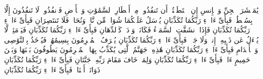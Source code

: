 یَٰمَعۡشَرَ ٱلۡجِنِّ وَٱلۡإِنسِ إِنِ ٱسۡتَطَعۡتُمۡ أَن تَنفُذُوا۟ مِنۡ أَقۡطَارِ ٱلسَّمَٰوَٰتِ وَٱلۡأَرۡضِ فَٱنفُذُوا۟ۚ لَا تَنفُذُونَ إِلَّا بِسُلۡطَٰنࣲ%
\stopbuffer%
\startbuffer[\q:55:34]
فَبِأَیِّ ءَالَاۤءِ رَبِّكُمَا تُكَذِّبَانِ%
\stopbuffer%
\startbuffer[\q:55:35]
یُرۡسَلُ عَلَیۡكُمَا شُوَاظࣱ مِّن نَّارࣲ وَنُحَاسࣱ فَلَا تَنتَصِرَانِ%
\stopbuffer%
\startbuffer[\q:55:36]
فَبِأَیِّ ءَالَاۤءِ رَبِّكُمَا تُكَذِّبَانِ%
\stopbuffer%
\startbuffer[\q:55:37]
فَإِذَا ٱنشَقَّتِ ٱلسَّمَاۤءُ فَكَانَتۡ وَرۡدَةࣰ كَٱلدِّهَانِ%
\stopbuffer%
\startbuffer[\q:55:38]
فَبِأَیِّ ءَالَاۤءِ رَبِّكُمَا تُكَذِّبَانِ%
\stopbuffer%
\startbuffer[\q:55:39]
فَیَوۡمَئِذࣲ لَّا یُسۡءَلُ عَن ذَنۢبِهِۦۤ إِنسࣱ وَلَا جَاۤنࣱّ%
\stopbuffer%
\startbuffer[\q:55:40]
فَبِأَیِّ ءَالَاۤءِ رَبِّكُمَا تُكَذِّبَانِ%
\stopbuffer%
\startbuffer[\q:55:41]
یُعۡرَفُ ٱلۡمُجۡرِمُونَ بِسِیمَٰهُمۡ فَیُؤۡخَذُ بِٱلنَّوَٰصِی وَٱلۡأَقۡدَامِ%
\stopbuffer%
\startbuffer[\q:55:42]
فَبِأَیِّ ءَالَاۤءِ رَبِّكُمَا تُكَذِّبَانِ%
\stopbuffer%
\startbuffer[\q:55:43]
هَٰذِهِۦ جَهَنَّمُ ٱلَّتِی یُكَذِّبُ بِهَا ٱلۡمُجۡرِمُونَ%
\stopbuffer%
\startbuffer[\q:55:44]
یَطُوفُونَ بَیۡنَهَا وَبَیۡنَ حَمِیمٍ ءَانࣲ%
\stopbuffer%
\startbuffer[\q:55:45]
فَبِأَیِّ ءَالَاۤءِ رَبِّكُمَا تُكَذِّبَانِ%
\stopbuffer%
\startbuffer[\q:55:46]
وَلِمَنۡ خَافَ مَقَامَ رَبِّهِۦ جَنَّتَانِ%
\stopbuffer%
\startbuffer[\q:55:47]
فَبِأَیِّ ءَالَاۤءِ رَبِّكُمَا تُكَذِّبَانِ%
\stopbuffer%
\startbuffer[\q:55:48]
ذَوَاتَاۤ أَفۡنَانࣲ%
\stopbuffer%
\startbuffer[\q:55:49]
فَبِأَیِّ ءَالَاۤءِ رَبِّكُمَا تُكَذِّبَانِ%
\stopbuffer%
